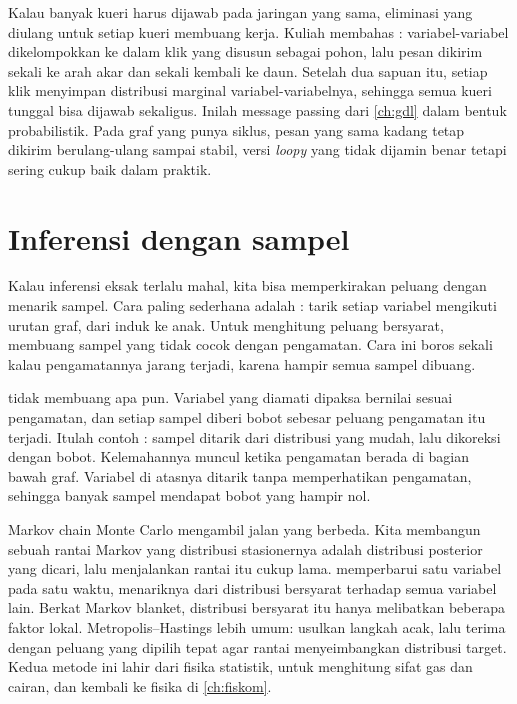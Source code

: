Kalau banyak kueri harus dijawab pada jaringan yang sama, eliminasi yang diulang untuk setiap kueri membuang kerja. Kuliah membahas
: variabel-variabel dikelompokkan ke dalam klik yang disusun sebagai pohon, lalu pesan dikirim sekali ke arah akar dan
sekali kembali ke daun. Setelah dua sapuan itu, setiap klik menyimpan distribusi marginal variabel-variabelnya, sehingga semua kueri
tunggal bisa dijawab sekaligus. Inilah message passing dari \cref{ch:gdl} dalam bentuk probabilistik. Pada graf yang punya siklus,
pesan yang sama kadang tetap dikirim berulang-ulang sampai stabil, versi \emph{loopy} yang tidak dijamin benar tetapi sering cukup baik
dalam praktik.

\section{Inferensi dengan sampel}

Kalau inferensi eksak terlalu mahal, kita bisa memperkirakan peluang dengan menarik sampel. Cara
paling sederhana adalah : tarik setiap variabel mengikuti urutan graf, dari
induk ke anak. Untuk menghitung peluang bersyarat,  membuang sampel yang
tidak cocok dengan pengamatan. Cara ini boros sekali kalau pengamatannya jarang terjadi, karena
hampir semua sampel dibuang.

 tidak membuang apa pun. Variabel yang diamati dipaksa bernilai sesuai
pengamatan, dan setiap sampel diberi bobot sebesar peluang pengamatan itu terjadi. Itulah
contoh : sampel ditarik dari distribusi yang mudah, lalu dikoreksi dengan
bobot. Kelemahannya muncul ketika pengamatan berada di bagian bawah graf. Variabel di atasnya
ditarik tanpa memperhatikan pengamatan, sehingga banyak sampel mendapat bobot yang hampir nol.

Markov chain Monte Carlo mengambil jalan yang berbeda. Kita membangun sebuah rantai Markov yang
distribusi stasionernya adalah distribusi posterior yang dicari, lalu menjalankan rantai itu cukup
lama.  memperbarui satu variabel pada satu waktu, menariknya dari distribusi
bersyarat terhadap semua variabel lain. Berkat Markov blanket, distribusi bersyarat itu hanya
melibatkan beberapa faktor lokal. Metropolis--Hastings \citep{metropolis1953,hastings1970} lebih umum:
usulkan langkah acak, lalu terima dengan peluang yang dipilih tepat agar rantai menyeimbangkan
distribusi target. Kedua metode ini lahir dari fisika statistik, untuk menghitung sifat gas dan
cairan, dan kembali ke fisika di \cref{ch:fiskom}.

